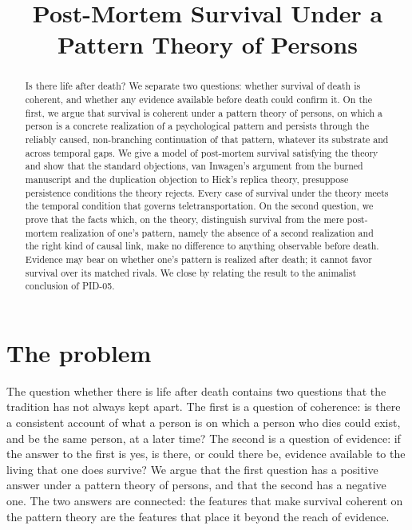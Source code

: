 \documentclass{situationist-preprint}
\title{Post-Mortem Survival Under a Pattern Theory of Persons}
\begin{document}
\maketitle

\begin{abstract}
Is there life after death? We separate two questions: whether survival of death is coherent, and whether any evidence available before death could confirm it. On the first, we argue that survival is coherent under a pattern theory of persons, on which a person is a concrete realization of a psychological pattern and persists through the reliably caused, non-branching continuation of that pattern, whatever its substrate and across temporal gaps. We give a model of post-mortem survival satisfying the theory and show that the standard objections, van Inwagen's argument from the burned manuscript and the duplication objection to Hick's replica theory, presuppose persistence conditions the theory rejects. Every case of survival under the theory meets the temporal condition that governs teletransportation. On the second question, we prove that the facts which, on the theory, distinguish survival from the mere post-mortem realization of one's pattern, namely the absence of a second realization and the right kind of causal link, make no difference to anything observable before death. Evidence may bear on whether one's pattern is realized after death; it cannot favor survival over its matched rivals. We close by relating the result to the animalist conclusion of PID-05.
\end{abstract}

\section{The problem}

The question whether there is life after death contains two questions that the tradition has not always kept apart. The first is a question of coherence: is there a consistent account of what a person is on which a person who dies could exist, and be the same person, at a later time? The second is a question of evidence: if the answer to the first is yes, is there, or could there be, evidence available to the living that one does survive? We argue that the first question has a positive answer under a pattern theory of persons, and that the second has a negative one. The two answers are connected: the features that make survival coherent on the pattern theory are the features that place it beyond the reach of evidence.
\end{document}
